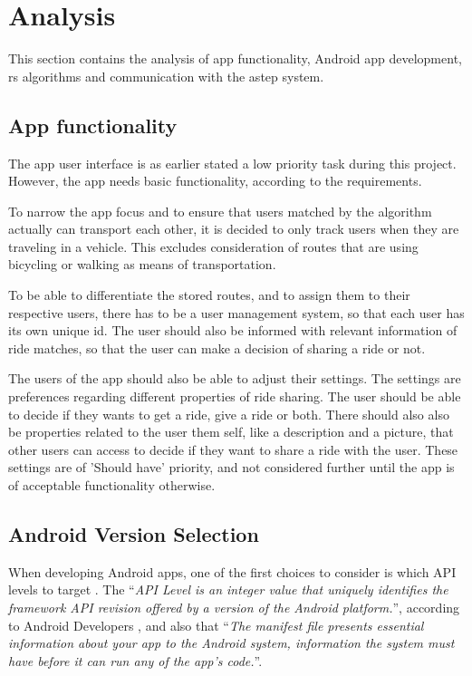 \section{Analysis}
This section contains the analysis of app functionality, Android app development, \gls{rs} algorithms and communication with the \gls{astep} system.

\subsection{App functionality}
The app user interface is as earlier stated a low priority task during this project.
However, the app needs basic functionality, according to the requirements.

To narrow the app focus and to ensure that users matched by the algorithm actually can transport each other, it is decided to only track users when they are traveling in a vehicle.
This excludes consideration of routes that are using bicycling or walking as means of transportation.

To be able to differentiate the stored routes, and to assign them to their respective users, there has to be a user management system, so that each user has its own unique id.
The user should also be informed with relevant information of ride matches, so that the user can make a decision of sharing a ride or not.

The users of the app should also be able to adjust their settings.
The settings are preferences regarding different properties of ride sharing.
The user should be able to decide if they wants to get a ride, give a ride or both.
There should also also be properties related to the user them self, like a description and a picture, that other users can access to decide if they want to share a ride with the user.
These settings are of 'Should have' priority, and not considered further until the app is of acceptable functionality otherwise.

\subsection{Android Version Selection}
When developing Android apps, one of the first choices to consider is which API levels to target \cite{usesSDK}.
The ``\textit{API Level is an integer value that uniquely identifies the framework API revision offered by a version of the Android platform.}'', according to Android Developers \cite{usesSDK}, and also that ``\textit{The manifest file presents essential information about your app to the Android system, information the system must have before it can run any of the app's code.}''.

